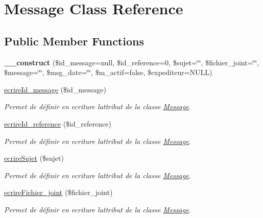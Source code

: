 \hypertarget{class_message}{}\section{Message Class Reference}
\label{class_message}
\subsection*{Public Member Functions}
\begin{DoxyCompactItemize}
\item 
\mbox{\label{class_message_a0fe98961a43499d9b725bd3358689927}} 
{\bfseries \+\_\+\+\_\+construct} (\$id\+\_\+message=null, \$id\+\_\+reference=0, \$sujet=\char`\"{}\char`\"{}, \$fichier\+\_\+joint=\char`\"{}\char`\"{}, \$message=\char`\"{}\char`\"{}, \$msg\+\_\+date=\char`\"{}\char`\"{}, \$m\+\_\+actif=false, \$expediteur=N\+U\+LL)
\item 
\hyperlink{class_message_aa1e4592b7600bff512985dbfaa48cbd2}{ecrire\+Id\+\_\+message} (\$id\+\_\+message)
\begin{DoxyCompactList}\small\item\em Permet de définir en ecriture l\textquotesingle{}attribut de la classe \hyperlink{class_message}{Message}. \end{DoxyCompactList}\item 
\hyperlink{class_message_a4fe696edd1a117bc669e919b1e134501}{ecrire\+Id\+\_\+reference} (\$id\+\_\+reference)
\begin{DoxyCompactList}\small\item\em Permet de définir en ecriture l\textquotesingle{}attribut de la classe \hyperlink{class_message}{Message}. \end{DoxyCompactList}\item 
\hyperlink{class_message_a1d5c9c4bbf0796264cc0fac911d65f3b}{ecrire\+Sujet} (\$sujet)
\begin{DoxyCompactList}\small\item\em Permet de définir en ecriture l\textquotesingle{}attribut de la classe \hyperlink{class_message}{Message}. \end{DoxyCompactList}\item 
\hyperlink{class_message_afe984505a2b8324fcae8f1d3b7c6bf77}{ecrire\+Fichier\+\_\+joint} (\$fichier\+\_\+joint)
\begin{DoxyCompactList}\small\item\em Permet de définir en ecriture l\textquotesingle{}attribut de la classe \hyperlink{class_message}{Message}. \end{DoxyCompactList}\item 

\end{DoxyCompactItemize}

